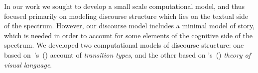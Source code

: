 %
In our work we sought to develop a small scale computational model, and thus
focused primarily on modeling discourse structure which lies on the textual
side of the spectrum. However, our discourse model includes a minimal model of
story, which is needed in order to account for some elements of the cognitive
side of the spectrum.  We developed two computational models of discourse
structure: one based
on~\citeauthor{mcCloud1993understanding}'s~(\citeyear{mcCloud1993understanding})
account of \emph{transition types}, and the other based on
\citeauthor{cohn2013visual}'s~(\citeyear{cohn2013visual}) \emph{theory of visual
language}.



